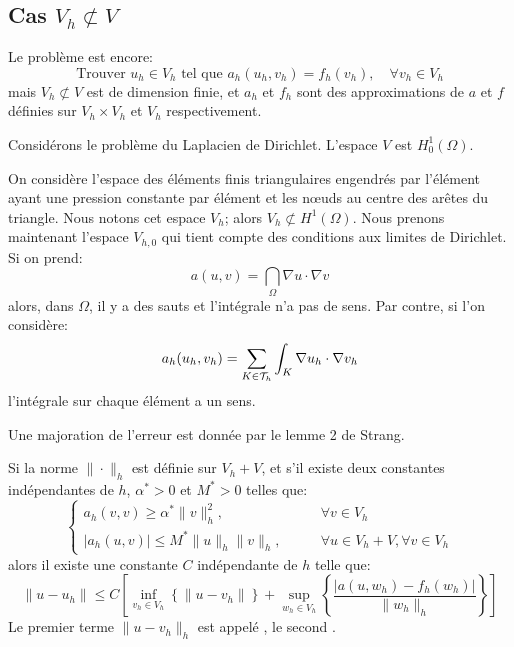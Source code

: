 \medskip
\subsection{Cas $V_h\not\subset V$}

Le problème est encore:
\begin{equation}
\text{Trouver } u_h\in V_h \text{ tel que } a_h(u_h,v_h) = f_h(v_h),\quad \forall v_h\in V_h
\end{equation}
mais $V_h\not\subset V$ est de dimension finie, et $a_h$ et $f_h$ sont des approximations de $a$ et $f$ définies sur $V_h\times V_h$ et $V_h$ respectivement.

\begin{remarque}[Motivation]
Considérons le problème du Laplacien de Dirichlet. L'espace $V$ est $H^1_0(\Omega)$.

On considère l'espace des éléments finis triangulaires engendrés par l'élément ayant une pression constante par élément et les nœuds au centre des arêtes du triangle. Nous notons cet espace $V_h$; alors $V_h\not\subset H^1(\Omega)$. Nous prenons maintenant l'espace $V_{h,0}$ qui tient compte des conditions aux limites de Dirichlet. Si on prend:
\begin{equation}a(u,v)=\dint_\Omega \nabla u\cdot \nabla v\end{equation} alors, dans $\Omega$, il y a
des sauts et l'intégrale n'a pas de sens. Par contre, si l'on considère:
\begin{equation} a_h(u_h,v_h)=\displaystyle\sum_{K\in\mathcal{T}_h}\displaystyle\int_K \nabla u_h\cdot\nabla v_h\end{equation}
l'intégrale sur chaque élément a un sens.
\end{remarque}

\medskip
Une majoration de l'erreur est donnée par le lemme 2 de Strang.
\begin{lemme}
Si la norme $\|\cdot\|_h$ est définie sur $V_h+V$, et s'il existe deux constantes indépendantes de $h$, $\alpha^*>0$ et $M^*>0$ telles que:
\[\left\{
\begin{array}{rl}
a_h(v,v)\ge\alpha^*\|v\|^2_h, \qquad &\forall v\in V_h \\[+2mm]
|a_h(u,v)|\le M^*\|u\|_h\|v\|_h, \qquad &\forall u\in V_h+V, \forall v\in V_h
\end{array}
\right.\]
alors il existe une constante $C$ indépendante de $h$ telle que:
\begin{equation}
\|u-u_h\|\le C\left[
\inf_{v_h\in V_h} \left\{ \|u-v_h\|\right\} +
\sup_{w_h\in V_h} \left\{\dfrac{|a(u,w_h)-f_h(w_h)|}{\|w_h\|_h}\right\}
\right]
\end{equation}
Le premier terme $ \|u-v_h\|_h$ est appelé ,
le second .
\end{lemme}



